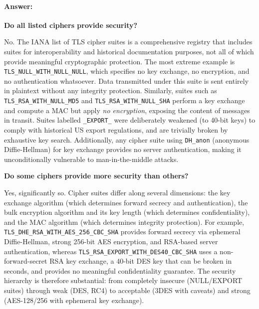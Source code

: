 \documentclass[]{scrartcl}
\begin{document}
\paragraph{Answer:}{

\textbf{Do all listed ciphers provide security?}

No. The IANA list of TLS cipher suites is a comprehensive registry that includes
suites for interoperability and historical documentation purposes, not all of which
provide meaningful cryptographic protection.
The most extreme example is \texttt{TLS\_NULL\_WITH\_NULL\_NULL}, which specifies no
key exchange, no encryption, and no authentication whatsoever.
Data transmitted under this suite is sent entirely in plaintext without any integrity
protection. Similarly, suites such as \texttt{TLS\_RSA\_WITH\_NULL\_MD5} and
\texttt{TLS\_RSA\_WITH\_NULL\_SHA} perform a key exchange and compute a MAC but
apply \emph{no encryption}, exposing the content of messages in transit.
Suites labelled \texttt{\_EXPORT\_} were deliberately weakened (to 40-bit keys) to
comply with historical US export regulations, and are trivially broken by exhaustive
key search.
Additionally, any cipher suite using \texttt{DH\_anon} (anonymous Diffie-Hellman) for
key exchange provides no server authentication, making it unconditionally vulnerable
to man-in-the-middle attacks.

\medskip
\textbf{Do some ciphers provide more security than others?}

Yes, significantly so.
Cipher suites differ along several dimensions: the key exchange algorithm (which
determines forward secrecy and authentication), the bulk encryption algorithm and its
key length (which determines confidentiality), and the MAC algorithm (which determines
integrity protection).
For example, \texttt{TLS\_DHE\_RSA\_WITH\_AES\_256\_CBC\_SHA} provides forward secrecy
via ephemeral Diffie-Hellman, strong 256-bit AES encryption, and RSA-based server
authentication, whereas \texttt{TLS\_RSA\_EXPORT\_WITH\_DES40\_CBC\_SHA} uses a
non-forward-secret RSA key exchange, a 40-bit DES key that can be broken in seconds,
and provides no meaningful confidentiality guarantee.
The security hierarchy is therefore substantial: from completely insecure (NULL/EXPORT
suites) through weak (DES, RC4) to acceptable (3DES with caveats) and strong
(AES-128/256 with ephemeral key exchange).
}
\end{document}
